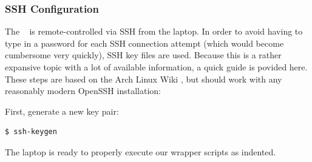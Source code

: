 \subsubsection{SSH Configuration}
\label{subsubsec:laptop:sshconf}

The \raspi~  is remote-controlled via SSH  from the laptop. In order  to avoid
having to  type in  a password  for each SSH  connection attempt  (which would
become cumbersome  very quickly), SSH  key files  are used. Because this  is a
rather expansive topic  with a lot of available information,  a quick guide is
povided  here\footnotemark. These  steps are  based  on  the Arch  Linux  Wiki
\cite{ref:archWiki:SSH} , but  should work with any  reasonably modern OpenSSH
installation:



First, generate a new key pair:

\begin{verbatim}
$ ssh-keygen
\end{verbatim}

The laptop is ready to properly execute our wrapper scripts as indented.
